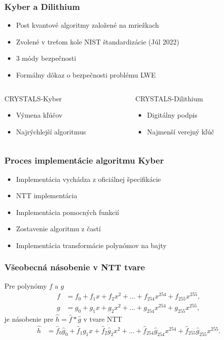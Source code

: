 \documentclass[%
  14pt,       				%
	t,                  %
	aspectratio=1610,   %
	unicode,						%
]{beamer}				    	%
\begin{document}
\begin{frame}[c]
	
	\frametitle{Kyber a Dilithium}
	\large{
		\begin{itemize}
			\item Post kvantové algoritmy založené na mriežkach
			\item Zvolené v treťom kole NIST štandardizácie (Júl 2022)
			\item 3 módy bezpečnosti
			\item Formálny dôkaz o bezpečnosti problému LWE
		\end{itemize}
		\vspace{3ex}
		\begin{columns}[T]
			\begin{column}{0.5\textwidth}
				CRYSTALS-Kyber
				\begin{itemize}
					\item Výmena kľúčov
					\item Najrýchlejší algoritmus
				\end{itemize}
			\end{column}
			\begin{column}{0.5\textwidth}
				CRYSTALS-Dilithium
				\begin{itemize}
					\item Digitálny podpis
					\item Najmenší verejný kľúč
				\end{itemize}
			\end{column}
		\end{columns}
	}
\end{frame}

\begin{frame}[c]
	\frametitle{Proces implementácie algoritmu Kyber}
	\large{
		\begin{itemize}
			\item Implementácia vychádza z oficiálnej špecifikácie
			\item NTT implementácia
			\item Implementácia pomocných funkcií
			\item Zostavenie algoritmu z častí
			\item Implementácia transformácie polynómov na bajty
		\end{itemize}
	}
\end{frame}

\begin{frame}[c]
	\frametitle{Všeobecná násobenie v NTT tvare}
	\large{
		Pre polynómy $f$ a $g$
		\begin{align*}
			f & = f_0 + f_1x + f_2x^2 + \dots + f_{254}x^{254} + f_{255}x^{255}, \\
			g & = g_0 + g_1x + g_2x^2 + \dots + g_{254}x^{254} + g_{255}x^{255},
		\end{align*}
		je násobenie pre $\hat{h}=\hat{f}*\hat{g}$ v tvare NTT
		\begin{align*}
			\hat{h} & = \hat{f}_0\hat{g}_0 + \hat{f}_1\hat{g}_1x + \hat{f}_2\hat{g}_2x^2 + \dots + \hat{f}_{254}\hat{g}_{254}x^{254} + \hat{f}_{255}\hat{g}_{255}x^{255}.
		\end{align*}
	}
\end{frame}
\end{document}
